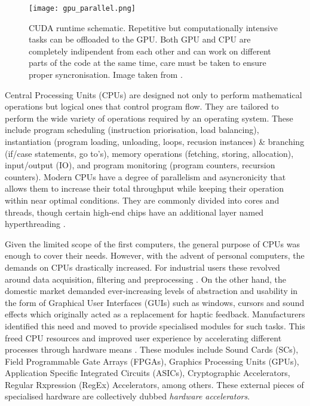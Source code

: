 \begin{figure}
  \centering
  \texttt{[image: gpu\_parallel.png]}
  \caption[CUDA runtime schematic.]{CUDA runtime schematic. Repetitive but computationally intensive tasks can be offloaded to the GPU. Both GPU and CPU are completely indipendent from each other and can work on different parts of the code at the same time, care must be taken to ensure proper syncronisation. Image taken from \cite{nvidia}.}
  \label{f:cuda}
\end{figure}

Central Processing Units (CPUs) are designed not only to perform mathematical operations but logical ones that control program flow. They are tailored to perform the wide variety of operations required by an operating system. These include program scheduling (instruction priorisation, load balancing), instantiation (program loading, unloading, loops, recusion instances) \& branching (if/case statements, go to's), memory operations (fetching, storing, allocation), input/output (IO), and program monitoring (program counters, recursion counters). Modern CPUs have a degree of parallelism and asyncronicity that allows them to increase their total throughput while keeping their operation within near optimal conditions. They are commonly divided into cores and threads, though certain high-end chips have an additional layer named hyperthreading \cite{cpu_arch}.

Given the limited scope of the first computers, the general purpose of CPUs was enough to cover their needs. However, with the advent of personal computers, the demands on CPUs drastically increased. For industrial users these revolved around data acquisition, filtering and preprocessing \cite{fpga, preproc, filtering}. On the other hand, the domestic market demanded ever-increasing levels of abstraction and usability in the form of Graphical User Interfaces (GUIs) such as windows, cursors and sound effects which originally acted as a replacement for haptic feedback. Manufacturers identified this need and moved to provide specialised modules for such tasks. This freed CPU resources and improved user experience by accelerating different processes through hardware means \cite{gpu1, gpu2, gpu3, sound}. These modules include Sound Cards (SCs), Field Programmable Gate Arrays (FPGAs), Graphics Processing Units (GPUs), Application Specific Integrated Circuits (ASICs), Cryptographic Accelerators, Regular Rxpression (RegEx) Accelerators, among others. These external pieces of specialised hardware are collectively dubbed \emph{hardware accelerators}.

